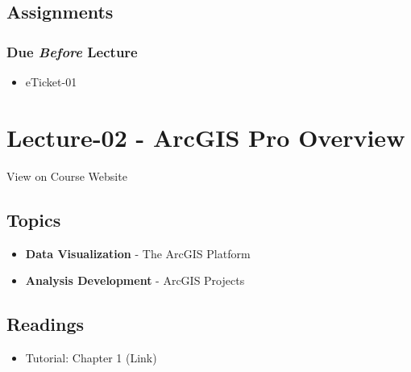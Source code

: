 \documentclass[]{book}
\providecommand{\tightlist}{%
  \setlength{\itemsep}{0pt}\setlength{\parskip}{0pt}}
\begin{document}
\hypertarget{assignments-2}{%
\subsection*{Assignments}\label{assignments-2}}

\hypertarget{due-before-lecture}{%
\subsubsection*{\texorpdfstring{Due \emph{Before} Lecture}{Due Before Lecture}}\label{due-before-lecture}}

\begin{itemize}
\tightlist
\item
  eTicket-01
\end{itemize}

\hypertarget{lecture-02---arcgis-pro-overview}{%
\section*{Lecture-02 - ArcGIS Pro Overview}\label{lecture-02---arcgis-pro-overview}}

View on Course Website

\hypertarget{topics-2}{%
\subsection*{Topics}\label{topics-2}}

\begin{itemize}
\tightlist
\item
  \textbf{Data Visualization} - The ArcGIS Platform
\item
  \textbf{Analysis Development} - ArcGIS Projects
\end{itemize}

\hypertarget{readings-3}{%
\subsection*{Readings}\label{readings-3}}

\begin{itemize}
\tightlist
\item
  Tutorial: Chapter 1 (Link)
\end{itemize}
\end{document}
